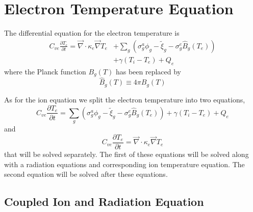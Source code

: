 \documentclass{article}
\newcommand{\partl}[2]{\ensuremath{\frac{\partial{#1}}{\partial{#2}}}}\newcommand{\del}{\ensuremath{\vec{\nabla}}}
\newcommand{\Bg}{\ensuremath{\hat{B}_{g}}}
\begin{document}
\section{Electron Temperature Equation}

The differential equation for the electron temperature is
\begin{equation}
  \begin{split}
	C_{ve} \partl{T_{e}}{t} = 
		\del \cdot \kappa_{e} \del T_{e} & +
		\sum_{g} \left(
			\sigma_{g}^{a} \phi_{g} - \tilde{\xi}_{g}
			- \sigma_{g}^{e} \Bg(T_{e}) \right) \\
			& + \gamma (T_{i} - T_{e}) + Q_{e}
  \end{split}
\end{equation}
where the Planck function $B_{g}(T)$ has been replaced by
\begin{equation}
	\Bg(T) \equiv 4\pi B_{g}(T)
\end{equation}

As for the ion equation we split the electron temperature into two
equations,
\begin{equation}
	C_{ve} \partl{T_{e}}{t} = 
		\sum_{g} \left(
			\sigma_{g}^{a} \phi_{g} - \tilde{\xi}_{g}
			- \sigma_{g}^{e} \Bg(T_{e}) \right)
			+ \gamma (T_{i} - T_{e}) + Q_{e}
\label{eq:couple_Te}
\end{equation}
and
\begin{equation}
	C_{ve} \partl{T_{e}}{t} = 
		\del \cdot \kappa_{e} \del T_{e}
\label{eq:conduction_Te}
\end{equation}
that will be solved separately.
The first of these equations will be solved along with a radiation
equations and corresponding
ion temperature equation.
The second equation will be solved after these equations.

\subsection{Coupled Ion and Radiation Equation}
\end{document}
